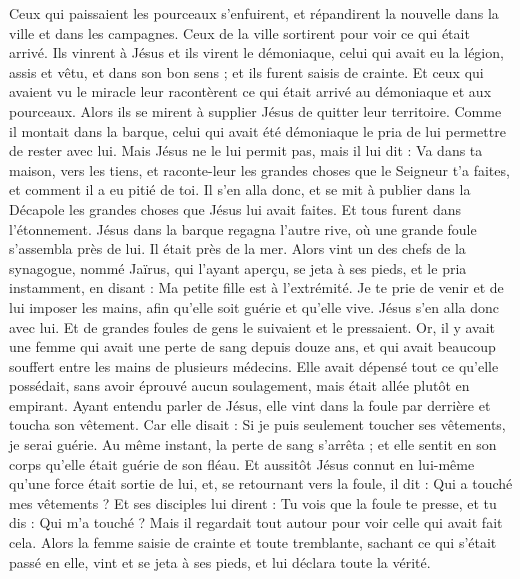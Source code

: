 \begin{multicols}{2}
Ceux qui paissaient les pourceaux s'enfuirent, et répandirent la nouvelle dans la ville et dans les campagnes.
Ceux de la ville sortirent pour voir ce qui était arrivé. Ils vinrent à Jésus et ils virent le démoniaque, celui qui avait eu la légion, assis et vêtu, et dans son bon sens ; et ils furent saisis de crainte.
Et ceux qui avaient vu le miracle leur racontèrent ce qui était arrivé au démoniaque et aux pourceaux.
Alors ils se mirent à supplier Jésus de quitter leur territoire.
Comme il montait dans la barque, celui qui avait été démoniaque le pria de lui permettre de rester avec lui.
Mais Jésus ne le lui permit pas, mais il lui dit : Va dans ta maison, vers les tiens, et raconte-leur les grandes choses que le Seigneur t'a faites, et comment il a eu pitié de toi.
Il s'en alla donc, et se mit à publier dans la Décapole les grandes choses que Jésus lui avait faites. Et tous furent dans l’étonnement.
Jésus dans la barque regagna l’autre rive, où une grande foule s’assembla près de lui. Il était près de la mer.
Alors vint un des chefs de la synagogue, nommé Jaïrus, qui l’ayant aperçu, se jeta à ses pieds,
et le pria instamment, en disant : Ma petite fille est à l'extrémité. Je te prie de venir et de lui imposer les mains, afin qu'elle soit guérie et qu'elle vive.
Jésus s'en alla donc avec lui. Et de grandes foules de gens le suivaient et le pressaient.
Or, il y avait une femme qui avait une perte de sang depuis douze ans,
et qui avait beaucoup souffert entre les mains de plusieurs médecins. Elle avait dépensé tout ce qu’elle possédait, sans avoir éprouvé aucun soulagement, mais était allée plutôt en empirant.
Ayant entendu parler de Jésus, elle vint dans la foule par derrière et toucha son vêtement.
Car elle disait : Si je puis seulement toucher ses vêtements, je serai guérie.
Au même instant, la perte de sang s'arrêta ; et elle sentit en son corps qu'elle était guérie de son fléau.
Et aussitôt Jésus connut en lui-même qu’une force était sortie de lui, et, se retournant vers la foule, il dit : Qui a touché mes vêtements ?
Et ses disciples lui dirent : Tu vois que la foule te presse, et tu dis : Qui m'a touché ?
Mais il regardait tout autour pour voir celle qui avait fait cela.
Alors la femme saisie de crainte et toute tremblante, sachant ce qui s’était passé en elle, vint et se jeta à ses pieds, et lui déclara toute la vérité.

\end{multicols}
